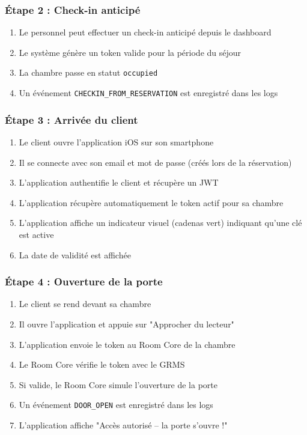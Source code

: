 \documentclass[11pt,a4paper]{article}
\begin{document}
\subsubsection{Étape 2 : Check-in anticipé}

\begin{enumerate}
    \item Le personnel peut effectuer un check-in anticipé depuis le dashboard
    \item Le système génère un token valide pour la période du séjour
    \item La chambre passe en statut \texttt{occupied}
    \item Un événement \texttt{CHECKIN\_FROM\_RESERVATION} est enregistré dans les logs
\end{enumerate}

\subsubsection{Étape 3 : Arrivée du client}

\begin{enumerate}
    \item Le client ouvre l'application iOS sur son smartphone
    \item Il se connecte avec son email et mot de passe (créés lors de la réservation)
    \item L'application authentifie le client et récupère un JWT
    \item L'application récupère automatiquement le token actif pour sa chambre
    \item L'application affiche un indicateur visuel (cadenas vert) indiquant qu'une clé est active
    \item La date de validité est affichée
\end{enumerate}

\subsubsection{Étape 4 : Ouverture de la porte}

\begin{enumerate}
    \item Le client se rend devant sa chambre
    \item Il ouvre l'application et appuie sur "Approcher du lecteur"
    \item L'application envoie le token au Room Core de la chambre
    \item Le Room Core vérifie le token avec le GRMS
    \item Si valide, le Room Core simule l'ouverture de la porte
    \item Un événement \texttt{DOOR\_OPEN} est enregistré dans les logs
    \item L'application affiche "Accès autorisé – la porte s'ouvre !"
\end{enumerate}
\end{document}
